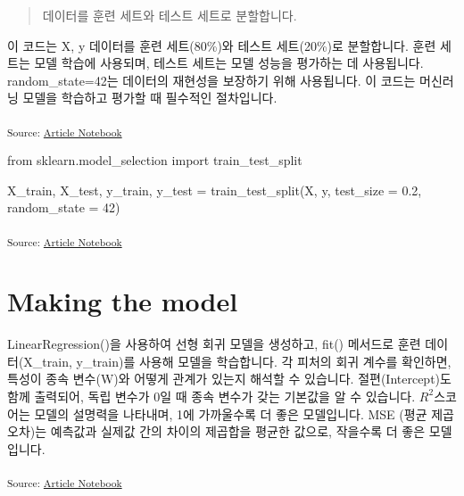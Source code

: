 \documentclass[
  a4paper,
  DIV=11,
  numbers=noendperiod]{scrreprt}
\newenvironment{Shaded}{\begin{snugshade}}{\end{snugshade}}
\newcommand{\DecValTok}[1]{\textcolor[rgb]{0.68,0.00,0.00}{#1}}
\newcommand{\FloatTok}[1]{\textcolor[rgb]{0.68,0.00,0.00}{#1}}
\newcommand{\ImportTok}[1]{\textcolor[rgb]{0.00,0.46,0.62}{#1}}
\newcommand{\NormalTok}[1]{\textcolor[rgb]{0.00,0.23,0.31}{#1}}
\newcommand{\OperatorTok}[1]{\textcolor[rgb]{0.37,0.37,0.37}{#1}}
\begin{document}
\begin{quote}
데이터를 훈련 세트와 테스트 세트로 분할합니다.
\end{quote}

이 코드는 X, y 데이터를 훈련 세트(80\%)와 테스트 세트(20\%)로
분할합니다. 훈련 세트는 모델 학습에 사용되며, 테스트 세트는 모델 성능을
평가하는 데 사용됩니다. random\_state=42는 데이터의 재현성을 보장하기
위해 사용됩니다. 이 코드는 머신러닝 모델을 학습하고 평가할 때 필수적인
절차입니다.

\textsubscript{Source:
\href{https://sigmadream.github.io/practice-quarto/NBA_2023-24.ipynb.html}{Article
Notebook}}

\begin{Shaded}
\begin{Highlighting}[]
\ImportTok{from}\NormalTok{ sklearn.model\_selection }\ImportTok{import}\NormalTok{ train\_test\_split}

\NormalTok{X\_train, X\_test, y\_train, y\_test }\OperatorTok{=}\NormalTok{ train\_test\_split(X, }
\NormalTok{                                                    y, }
\NormalTok{                                                    test\_size }\OperatorTok{=} \FloatTok{0.2}\NormalTok{, }
\NormalTok{                                                    random\_state }\OperatorTok{=} \DecValTok{42}\NormalTok{)}
\end{Highlighting}
\end{Shaded}

\textsubscript{Source:
\href{https://sigmadream.github.io/practice-quarto/NBA_2023-24.ipynb.html}{Article
Notebook}}

\chapter{Making the model}\label{making-the-model}

LinearRegression()을 사용하여 선형 회귀 모델을 생성하고, fit() 메서드로
훈련 데이터(X\_train, y\_train)를 사용해 모델을 학습합니다. 각 피처의
회귀 계수를 확인하면, 특성이 종속 변수(W)와 어떻게 관계가 있는지 해석할
수 있습니다. 절편(Intercept)도 함께 출력되어, 독립 변수가 0일 때 종속
변수가 갖는 기본값을 알 수 있습니다. \(R^2\)스코어는 모델의 설명력을
나타내며, 1에 가까울수록 더 좋은 모델입니다. MSE (평균 제곱 오차)는
예측값과 실제값 간의 차이의 제곱합을 평균한 값으로, 작을수록 더 좋은
모델입니다.

\textsubscript{Source:
\href{https://sigmadream.github.io/practice-quarto/NBA_2023-24.ipynb.html}{Article
Notebook}}
\end{document}
